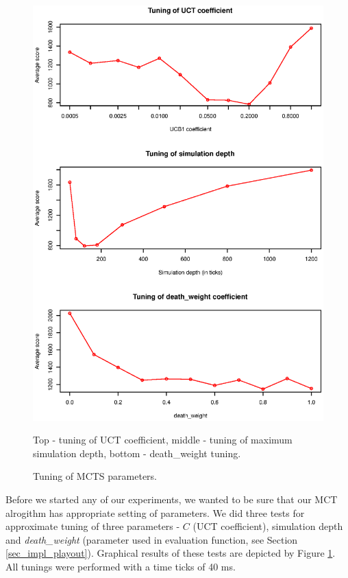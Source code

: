 \begin{figure}
\begin{center}
\includegraphics{img/mcts-tuning.eps}
\end{center}
\caption{\footnotesize Tuning of MCTS parameters.}{\footnotesize Top - tuning of UCT
coefficient, middle - tuning of maximum simulation depth, bottom - death\_weight tuning.}
\label{fig_mcts_tuning}
\end{figure}

Before we started any of our experiments, we wanted to be sure that our MCT alrogithm has
appropriate setting of parameters. We did three tests for approximate tuning of three
parameters - $C$ (UCT coefficient), simulation depth and \emph{death\_weight} (parameter used in
evaluation function, see Section \ref{sec_impl_playout}). Graphical results of these tests are
depicted by Figure \ref{fig_mcts_tuning}. All tunings were performed with a time ticks of 40
ms.

